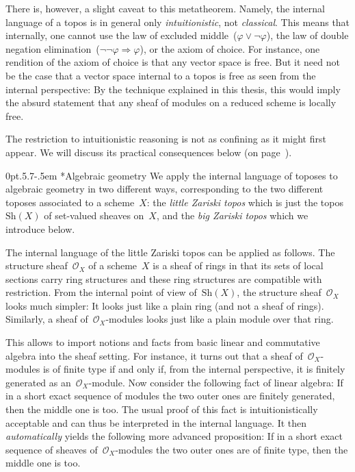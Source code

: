 \documentclass[10pt,reqno,a4paper]{amsbook}
\makeatletter
\theoremstyle{definition}
\theoremstyle{plain}
\theoremstyle{remark}
\renewcommand{\O}{\mathcal{O}}
\newcommand{\Sh}{\mathrm{Sh}}
\newcommand{\?}{\,{:}\,}
\renewcommand{\_}{\mathpunct{.}\,}
\def\subsection{\@startsection{subsection}{2}%
  {0pt}{.5\linespacing\@plus.7\linespacing}{-.5em}%
  {\normalfont\bfseries}}
\makeatother
\begin{document}
{There is, however, a slight caveat to this metatheorem. Namely, the internal
language of a topos is in general only \emph{intuitionistic}, not
\emph{classical}. This means that internally, one cannot use the law of
excluded middle~($\varphi \vee \neg\varphi$), the law of double negation
elimination~($\neg\neg\varphi \Rightarrow \varphi$), or the axiom of choice.
For instance, one rendition of the axiom of choice is that any vector space is
free. But it need not be the case that a vector space internal to a topos
is free as seen from the internal perspective: By the technique explained in
this thesis, this would imply the absurd statement that any sheaf of modules on
a reduced scheme is locally free.

The restriction to intuitionistic reasoning is not as confining as it might first
appear. We will discuss its practical consequences below (on
page~\pageref{sect:appreciating-intuitionistic-logic}).


\subsection*{Algebraic geometry}
We apply the internal language of toposes to algebraic geometry in two
different ways, corresponding to the two different toposes associated to a
scheme~$X$: the \emph{little Zariski topos} which is just the topos~$\Sh(X)$ of
set-valued sheaves on~$X$, and the \emph{big Zariski topos} which we introduce
below.

The internal language of the little Zariski topos can be applied as follows.
The structure sheaf~$\O_X$ of a scheme~$X$ is a sheaf of rings in that its sets of
local sections carry ring structures and these ring structures are compatible
with restriction. From the internal point of view of~$\Sh(X)$,
the structure
sheaf~$\O_X$ looks much simpler: It looks just like a plain ring (and
not a sheaf of rings). Similarly, a sheaf of~$\O_X$-modules looks just like a
plain module over that ring.

This allows to import notions and facts from basic linear and commutative
algebra into the sheaf setting. For instance, it turns out that a sheaf
of~$\O_X$-modules is of finite type if and only if, from the internal
perspective, it is finitely generated as an~$\O_X$-module. Now consider the
following fact of linear algebra: If in a short exact sequence of modules the two
outer ones are finitely generated, then the middle one is too. The usual proof of
this fact is intuitionistically acceptable and can thus be interpreted in the
internal language. It then \emph{automatically} yields the following more advanced
proposition: If in a short exact sequence of sheaves of~$\O_X$-modules the
two outer ones are of finite type, then the middle one is too.

}
\end{document}
